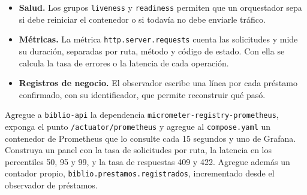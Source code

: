 \begin{itemize}
	\item \textbf{Salud.} Los grupos \texttt{liveness} y \texttt{readiness} permiten que un orquestador sepa si debe reiniciar el contenedor o si todavía no debe enviarle tráfico.
	\item \textbf{Métricas.} La métrica \texttt{http.server.requests} cuenta las solicitudes y mide su duración, separadas por ruta, método y código de estado. Con ella se calcula la tasa de errores o la latencia de cada operación.
	\item \textbf{Registros de negocio.} El observador  escribe una línea por cada préstamo confirmado, con su identificador, que permite reconstruir qué pasó.
\end{itemize}

\begin{practicaBox}[title={Práctica 10.1: métricas en Prometheus y Grafana}]
	Agregue a \texttt{biblio-api} la dependencia \texttt{micrometer-registry-prometheus}, exponga el punto \texttt{/actuator/prometheus} y agregue al \texttt{compose.yaml} un contenedor de Prometheus que lo consulte cada 15 segundos y uno de Grafana. Construya un panel con la tasa de solicitudes por ruta, la latencia en los percentiles 50, 95 y 99, y la tasa de respuestas 409 y 422. Agregue además un contador propio, \texttt{biblio.prestamos.registrados}, incrementado desde el observador de préstamos.
\end{practicaBox}
